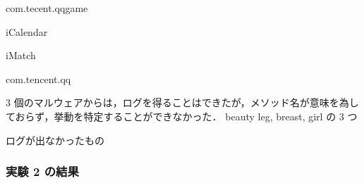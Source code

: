 com.tecent.qqgame

iCalendar

iMatch

com.tencent.qq

3 個のマルウェアからは，ログを得ることはできたが，メソッド名が意味を為しておらず，挙動を特定することができなかった．
beauty leg, breast, girl の 3 つ

ログが出なかったもの

\subsubsection{実験 2 の結果}

